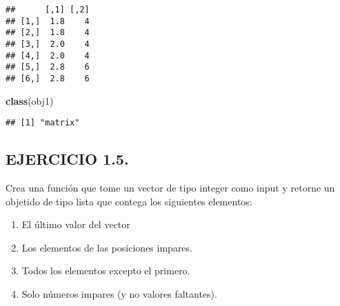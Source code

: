 \documentclass[]{article}
\newenvironment{Shaded}{\begin{snugshade}}{\end{snugshade}}
\newcommand{\KeywordTok}[1]{\textcolor[rgb]{0.13,0.29,0.53}{\textbf{#1}}}
\newcommand{\NormalTok}[1]{#1}
\providecommand{\tightlist}{%
  \setlength{\itemsep}{0pt}\setlength{\parskip}{0pt}}
\begin{document}
\begin{verbatim}
##      [,1] [,2]
## [1,]  1.8    4
## [2,]  1.8    4
## [3,]  2.0    4
## [4,]  2.0    4
## [5,]  2.8    6
## [6,]  2.8    6
\end{verbatim}

\begin{Shaded}
\begin{Highlighting}[]
\KeywordTok{class}\NormalTok{(obj1)}
\end{Highlighting}
\end{Shaded}

\begin{verbatim}
## [1] "matrix"
\end{verbatim}

\hypertarget{ejercicio-1.5.}{%
\subsection{EJERCICIO 1.5.}\label{ejercicio-1.5.}}

Crea una función que tome un vector de tipo integer como input y retorne
un objetido de tipo lista que contega los siguientes elementos:

\begin{enumerate}
\def\labelenumi{\arabic{enumi}.}
\tightlist
\item
  El último valor del vector
\item
  Los elementos de las posiciones impares.
\item
  Todos los elementos excepto el primero.
\item
  Solo números impares (y no valores faltantes).
\end{enumerate}
\end{document}
